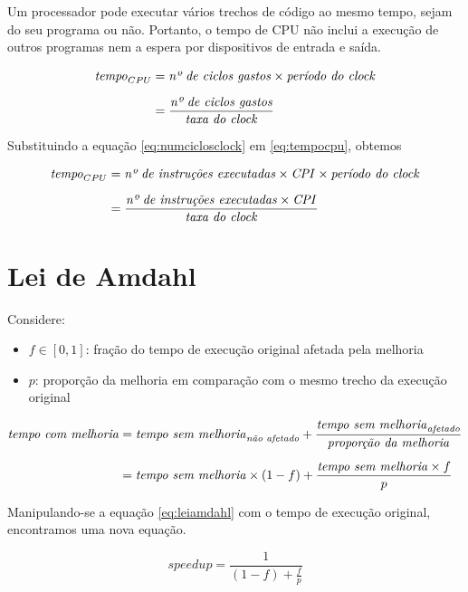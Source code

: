 \documentclass[12pt]{article}
\newcommand{\Text}[1]{\textrm{\textit{#1}}}
\begin{document}
\begin{tcolorbox}[title=Lembre-se]
  Um processador pode executar vários trechos de código ao mesmo tempo, sejam do seu programa ou não. Portanto, o tempo de CPU não inclui a execução de outros programas nem a espera por dispositivos de entrada e saída.
\end{tcolorbox}

\begin{align} \label{eq:tempocpu}
  \Text{tempo}_{CPU} &= \Text{nº de ciclos gastos} \times \Text{período do clock} \\[\medskipamount]
  &= \frac{\Text{nº de ciclos gastos}}{\Text{taxa do clock}} \nonumber
\end{align}

Substituindo a equação \ref{eq:numciclosclock} em \ref{eq:tempocpu}, obtemos

\begin{align} \label{eq:desempenho}
  \Text{tempo}_{CPU}
  &= \Text{nº de instruções executadas} \times \Text{CPI} \times \Text{período do clock} \\[\medskipamount]
  &= \frac{\Text{nº de instruções executadas} \times \Text{CPI}}{\Text{taxa do clock}} \nonumber
\end{align}


\section{Lei de Amdahl}


Considere:
\begin{itemize}
  \item \(f \in [0, 1]\): fração do tempo de execução original afetada pela melhoria
  \item \(p\): proporção da melhoria em comparação com o mesmo trecho da execução original
\end{itemize}

\begin{align} \label{eq:leiamdahl}
  \Text{tempo com melhoria}
  &= \Text{tempo sem melhoria}_\Text{não afetado}
  + \frac{\Text{tempo sem melhoria}_\Text{afetado}}{\Text{proporção da melhoria}} \\[\medskipamount]\nonumber
  &= \Text{tempo sem melhoria} \times (1 - f)
  + \frac{\Text{tempo sem melhoria} \times f}{p}
\end{align}

Manipulando-se a equação \ref{eq:leiamdahl} com o tempo de execução original, encontramos uma nova equação.

\begin{equation} \label{eq:speedupamdahl}
  speedup = \frac{1}{(1 - f) + \frac{f}{p}}
\end{equation}
\end{document}
